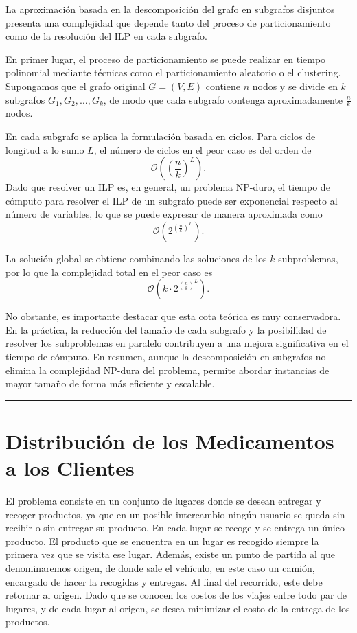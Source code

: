 \documentclass[twocolumn, fontsize=10pt]{article}
\theoremstyle{definition} %
\begin{document}
La aproximación basada en la descomposición del grafo en subgrafos disjuntos presenta una complejidad que depende tanto del proceso de particionamiento como de la resolución del ILP en cada subgrafo.

En primer lugar, el proceso de particionamiento se puede realizar en tiempo polinomial mediante técnicas como el particionamiento aleatorio o el clustering. Supongamos que el grafo original \( G = (V,E) \) contiene \( n \) nodos y se divide en \( k \) subgrafos \( G_1, G_2, \dots, G_k \), de modo que cada subgrafo contenga aproximadamente \( \frac{n}{k} \) nodos.

En cada subgrafo se aplica la formulación basada en ciclos. Para ciclos de longitud a lo sumo \( L \), el número de ciclos en el peor caso es del orden de
\[
\mathcal{O}\left(\left(\frac{n}{k}\right)^L\right).
\]
Dado que resolver un ILP es, en general, un problema NP-duro, el tiempo de cómputo para resolver el ILP de un subgrafo puede ser exponencial respecto al número de variables, lo que se puede expresar de manera aproximada como
\[
\mathcal{O}\left(2^{\left(\frac{n}{k}\right)^L}\right).
\]

La solución global se obtiene combinando las soluciones de los \( k \) subproblemas, por lo que la complejidad total en el peor caso es
\[
\mathcal{O}\left(k \cdot 2^{\left(\frac{n}{k}\right)^L}\right).
\]

No obstante, es importante destacar que esta cota teórica es muy conservadora. En la práctica, la reducción del tamaño de cada subgrafo y la posibilidad de resolver los subproblemas en paralelo contribuyen a una mejora significativa en el tiempo de cómputo. En resumen, aunque la descomposición en subgrafos no elimina la complejidad NP-dura del problema, permite abordar instancias de mayor tamaño de forma más eficiente y escalable.


\rule{\linewidth}{0.5pt}

\section{Distribución de los Medicamentos a los Clientes}
El problema consiste en un conjunto de lugares donde se desean entregar y recoger productos, ya que en un posible intercambio ningún usuario se queda sin recibir o sin entregar su producto. En cada lugar se recoge y se entrega un único producto. El producto que se encuentra en un lugar es recogido siempre la primera vez que se visita ese lugar. Además, existe un punto de partida al que denominaremos origen, de donde sale el vehículo, en este caso un camión, encargado de hacer la recogidas y entregas. Al final del recorrido, este debe retornar al origen.  Dado que se conocen los costos de los viajes entre todo par de lugares, y de cada lugar al origen, se desea minimizar el costo de la entrega de los productos.
\end{document}
